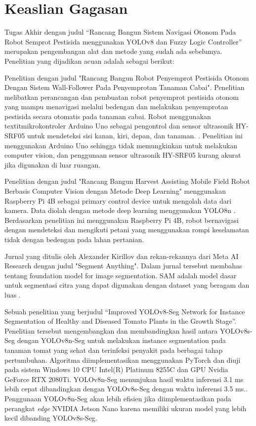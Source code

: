 \section{Keaslian Gagasan}
Tugas Akhir dengan judul “Rancang Bangun Sistem Navigasi Otonom Pada Robot Semprot Pestisida menggunakan YOLOv8 dan Fuzzy Logic Controller” merupakan pengembangan alat dan metode yang sudah ada sebelumya. Penelitian yang dijadikan acuan adalah sebagai berikut:
\begin{packed_enum}
	\item Penelitian dengan judul "Rancang Bangun Robot Penyemprot Pestisida Otonom Dengan Sistem Wall-Follower Pada Penyemprotan Tanaman Cabai". Penelitian melibatkan perancangan dan pembuatan robot penyemprot pestisida otonom yang mampu menavigasi melalui bedengan dan melakukan penyemprotan pestisida secara otomatis pada tanaman cabai. Robot menggunakan textit{mikrokontroler Arduino Uno} sebagai pengontrol dan sensor ultrasonik HY-SRF05 untuk mendeteksi sisi kanan, kiri, depan, dan tanaman. \cite{budiono2021rancang}. Penelitian ini menggunakan Arduino Uno sehingga tidak memungkinkan untuk melakukan computer vision, dan penggunaan sensor ultrasonik HY-SRF05 kurang akurat jika digunakan di luar ruangan.
	
	\item Penelitian dengan judul  "Rancang Bangun Harvest Assisting Mobile Field Robot Berbasis Computer Vision dengan Metode Deep Learning" menggunakan Raspberry Pi 4B sebagai primary control device untuk mengolah data dari kamera. Data diolah dengan metode deep learning menggunakan YOLO8n \cite{mainda2023rancang}. Berdasarkan penelitian ini menggunakan  Raspberry Pi 4B, robot bernavigasi dengan mendeteksi dan mengikuti petani yang menggunakan rompi keselamatan tidak dengan bedengan pada lahan pertanian.
	
	\item Jurnal yang ditulis oleh Alexander Kirillov dan rekan-rekannya dari Meta AI Research dengan judul "Segment Anything". Dalam jurnal tersebut membahas tentang foundation model for image segmentation. SAM adalah model dasar untuk segmentasi citra yang dapat digunakan dengan dataset yang beragam dan luas \cite{Kirillov_2023_ICCV}.
	
	\item Sebuah penelitian yang berjudul “Improved YOLOv8-Seg Network for Instance Segmentation of Healthy and Diseased Tomato Plants in the Growth Stage”. Penelitian tersebut mengembangkan dan membandingkan hasil antara YOLOv8s-Seg dengan YOLOv8n-Seg untuk melakukan instance segmentation pada tanaman tomat yang sehat dan terinfeksi penyakit pada berbagai tahap pertumbuhan. Algoritma diimplementasikan menggunakan PyTorch dan diuji pada sistem Windows 10 CPU Intel(R) Platinum 8255C dan GPU Nvidia GeForce RTX 2080Ti. YOLOv8n-Seg menunjukan hasil waktu inferensi 3.1 ms lebih cepat dibandingkan dengan  YOLOv8s-Seg dengan  waktu inferensi 3.5 ms.\cite{agriculture13081643}. Penggunaan YOLOv8n-Seg akan lebih efisien jika diimplementasikan pada perangkat \textit{edge} NVIDIA Jetson Nano karena memiliki ukuran model yang lebih kecil dibanding YOLOv8s-Seg.
	

\end{packed_enum}
